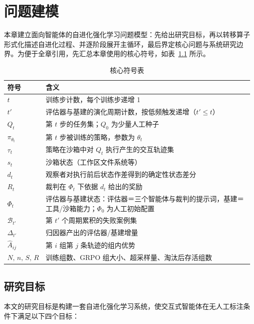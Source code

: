 \chapter{问题建模}

本章建立面向智能体的自进化强化学习问题模型：先给出研究目标，再以转移算子形式化描述自进化过程、并逐阶段展开主循环，最后界定核心问题与系统研究边界。为便于全章引用，先汇总本章使用的核心符号，如表~\ref{tab:symbols} 所示。

\begin{table}[htbp]
    \centering
    \caption{核心符号表}
    \label{tab:symbols}
    \begin{tabularx}{\textwidth}{lX}
        \hline
        符号 & 含义 \\
        \hline
        $t$ & 训练步计数，每个训练步递增 1 \\
        $t'$ & 评估器与基建的演化周期计数，按低频触发递增（$t' \le t$） \\
        $Q_t$ & 第 $t$ 步的任务集；$Q_0$ 为少量人工种子 \\
        $\pi_{\theta_t}$ & 第 $t$ 步被训练的策略，参数为 $\theta_t$ \\
        $\tau_t$ & 策略在沙箱中对 $Q_t$ 执行产生的交互轨迹集 \\
        $s_t$ & 沙箱状态（工作区文件系统等） \\
        $d_t$ & 观察者对执行前后状态作差得到的确定性状态差分 \\
        $R_t$ & 裁判在 $\Phi_t$ 下依据 $d_t$ 给出的奖励 \\
        $\Phi_t$ & 评估器与基建状态：评估器＝三个智能体与裁判的提示词，基建＝工具/沙箱能力；$\Phi_0$ 为人工初始配置 \\
        $\mathcal{B}_{t'}$ & 第 $t'$ 个周期累积的失败案例集 \\
        $\Delta_{t'}$ & 归因器产出的评估器/基建增量 \\
        $\hat{A}_{ij}$ & 第 $i$ 组第 $j$ 条轨迹的组内优势 \\
        $N,\,n,\,S,\,R$ & 训练组数、GRPO 组大小、超采样量、淘汰后存活组数 \\
        \hline
    \end{tabularx}
\end{table}

\section{研究目标}

本文的研究目标是构建一套自进化强化学习系统，使交互式智能体在无人工标注条件下满足以下四个目标：

